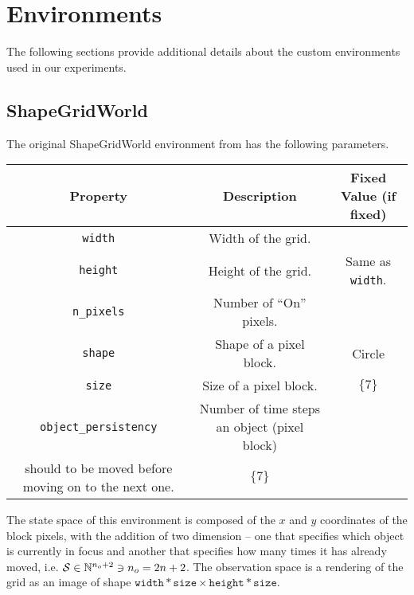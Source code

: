 \chapter{Environments}
The following sections provide additional details about the custom environments used in our experiments.


\section{ShapeGridWorld}
\label{sec:sgw-details}
The original ShapeGridWorld environment from \cite{rair} has the following parameters.

\begin{table}[H]
    \centering
    \begin{tabular}{|c c c|}
        \hline
        Property & Description & Fixed Value (if fixed)\\
        \hline\hline
        \texttt{width} & Width of the grid. & \\
        \texttt{height} & Height of the grid. & Same as \texttt{width}.\\
        \texttt{n\_pixels} & Number of ``On'' pixels. & \\
        \texttt{shape} & Shape of a pixel block. & Circle\\
        \texttt{size} & Size of a pixel block. & \(\{7\}\)\\
        \texttt{object\_persistency} & Number of time steps an object (pixel block) \\should to be moved before moving on to the next one. & \(\{7\}\)\\
        \hline
    \end{tabular}
\end{table}

The state space of this environment is composed of the \(x\) and \(y\) coordinates of the block pixels, with the addition of two dimension -- one that specifies which object is currently in focus and another that specifies how many times it has already moved, i.e. \(\mathcal{S} \in \mathbb{N}^{n_o + 2} \ni n_o = 2 n + 2\).
The observation space is a rendering of the grid as an image of shape \(\texttt{width} * \texttt{size} \times \texttt{height} * \texttt{size}\).

